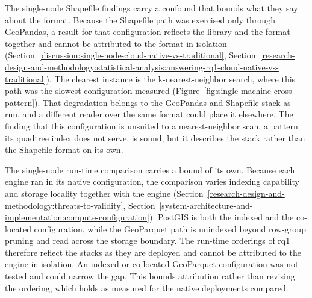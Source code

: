 The single-node Shapefile findings carry a confound that bounds what they say about the format. Because the Shapefile path was exercised only through GeoPandas, a result for that configuration reflects the library and the format together and cannot be attributed to the format in isolation (Section~\ref{discussion:single-node-cloud-native-vs-traditional}, Section~\ref{research-design-and-methodology:statistical-analysis:answering-rq1-cloud-native-vs-traditional}). The clearest instance is the k-nearest-neighbor search, where this path was the slowest configuration measured (Figure~\ref{fig:single-machine-cross-pattern}). That degradation belongs to the GeoPandas and Shapefile stack as run, and a different reader over the same format could place it elsewhere. The finding that this configuration is unsuited to a nearest-neighbor scan, a pattern its quadtree index does not serve, is sound, but it describes the stack rather than the Shapefile format on its own.

The single-node run-time comparison carries a bound of its own. Because each engine ran in its native configuration, the comparison varies indexing capability and storage locality together with the engine (Section~\ref{research-design-and-methodology:threats-to-validity}, Section~\ref{system-architecture-and-implementation:compute-configuration}). PostGIS is both the indexed and the co-located configuration, while the GeoParquet path is unindexed beyond row-group pruning and read across the storage boundary. The run-time orderings of \acrshort{rq}1 therefore reflect the stacks as they are deployed and cannot be attributed to the engine in isolation. An indexed or co-located GeoParquet configuration was not tested and could narrow the gap. This bounds attribution rather than revising the ordering, which holds as measured for the native deployments compared.

